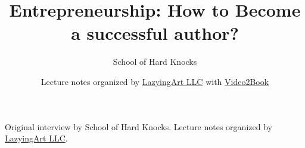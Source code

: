 \documentclass[11pt,oneside]{book}
\begin{document}
\frontmatter
\title{Entrepreneurship: How to Become a successful author?}
\author{School of Hard Knocks}
\date{Lecture notes organized by \href{https://lazying.art}{LazyingArt LLC} with \href{https://github.com/lachlanchen/Video2Book}{Video2Book}}
\maketitle
\begin{center}
\small Original interview by School of Hard Knocks. Lecture notes organized by \href{https://lazying.art}{LazyingArt LLC}.
\end{center}
\clearpage
\mainmatter

\end{document}
